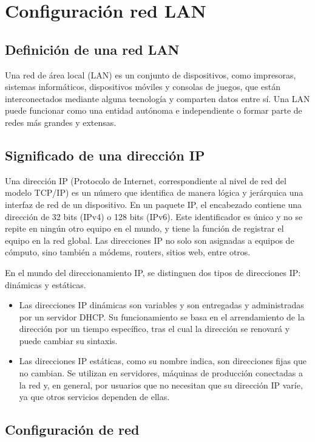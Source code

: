 \chapter{Configuración red LAN}\label{ch:red lan}

		\section{Definición de una red LAN}
		Una red de área local (LAN) es un conjunto de dispositivos, como impresoras, sistemas informáticos, dispositivos móviles y consolas de juegos, que están interconectados mediante alguna tecnología y comparten datos entre sí. Una LAN puede funcionar como una entidad autónoma e independiente o formar parte de redes más grandes y extensas.
		
		\section{Significado de una dirección IP}
		Una dirección IP (Protocolo de Internet, correspondiente al nivel de red del modelo TCP/IP) es un número que identifica de manera lógica y jerárquica una interfaz de red de un dispositivo. En un paquete IP, el encabezado contiene una dirección de 32 bits (IPv4) o 128 bits (IPv6). Este identificador es único y no se repite en ningún otro equipo en el mundo, y tiene la función de registrar el equipo en la red global. Las direcciones IP no solo son asignadas a equipos de cómputo, sino también a módems, routers, sitios web, entre otros.
		
		En el mundo del direccionamiento IP, se distinguen dos tipos de direcciones IP: dinámicas y estáticas.
		\begin{itemize}
			\item Las direcciones IP dinámicas son variables y son entregadas y administradas por un servidor DHCP. Su funcionamiento se basa en el arrendamiento de la dirección por un tiempo específico, tras el cual la dirección se renovará y puede cambiar su sintaxis.
		
			\item Las direcciones IP estáticas, como su nombre indica, son direcciones fijas que no cambian. Se utilizan en servidores, máquinas de producción conectadas a la red y, en general, por usuarios que no necesitan que su dirección IP varíe, ya que otros servicios dependen de ellas.
		\end{itemize}
			
		\section{Configuración de red}
		
